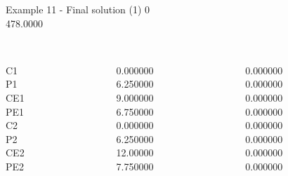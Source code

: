 \begin{frame}{Example 11 - Final solution (1)}
\footnotesize
{}  0\\
  478.0000\\

\begin{columns}[t]
\begin{column}{0.3\textwidth}
\\
C1\\
P1\\
CE1\\
PE1\\
C2\\
P2\\
CE2\\
PE2\\
\end{column}
\begin{column}{0.3\textwidth}
\\
0.000000\\
6.250000\\
9.000000\\
6.750000\\
0.000000\\
6.250000\\
12.00000\\
7.750000\\
\end{column}

\begin{column}{0.3\textwidth}
\\
0.000000\\
0.000000\\
0.000000\\
0.000000\\
0.000000\\
0.000000\\
0.000000\\
0.000000\\
\end{column}
\end{columns}
\end{frame}


